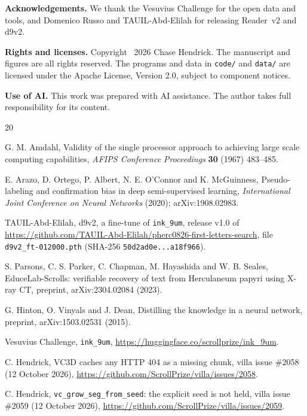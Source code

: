 \documentclass[11pt]{article}
\begin{document}
\medskip
\noindent\textbf{Acknowledgements.} We thank the Vesuvius Challenge for the open data and tools, and Domenico Russo and TAUIL-Abd-Elilah for releasing Reader~v2 and d9v2.

\noindent\textbf{Rights and licenses.} Copyright \textcopyright\ 2026 Chase Hendrick. The manuscript and figures are all rights reserved. The programs and data in \texttt{code/} and \texttt{data/} are licensed under the Apache License, Version 2.0, subject to component notices.

\noindent\textbf{Use of AI.} This work was prepared with AI assistance. The author takes full responsibility for its content.

\begin{thebibliography}{20}

 G. M. Amdahl, Validity of the single processor approach to achieving large scale computing capabilities, \emph{AFIPS Conference Proceedings} \textbf{30} (1967) 483--485.

 E. Arazo, D. Ortego, P. Albert, N. E. O'Connor and K. McGuinness, Pseudo-labeling and confirmation bias in deep semi-supervised learning, \emph{International Joint Conference on Neural Networks} (2020); arXiv:1908.02983.

 TAUIL-Abd-Elilah, d9v2, a fine-tune of \texttt{ink\_9um}, release v1.0 of \url{https://github.com/TAUIL-Abd-Elilah/pherc0826-first-letters-search}, file \texttt{d9v2\_ft-012000.pth} (SHA-256 \texttt{50d2ad0e...a18f966}).

 S. Parsons, C. S. Parker, C. Chapman, M. Hayashida and W. B. Seales, EduceLab-Scrolls: verifiable recovery of text from Herculaneum papyri using X-ray CT, preprint, arXiv:2304.02084 (2023).

 G. Hinton, O. Vinyals and J. Dean, Distilling the knowledge in a neural network, preprint, arXiv:1503.02531 (2015).

 Vesuvius Challenge, \texttt{ink\_9um}, \url{https://huggingface.co/scrollprize/ink_9um}.

 C. Hendrick, VC3D caches any HTTP 404 as a missing chunk, villa issue \#2058 (12 October 2026), \url{https://github.com/ScrollPrize/villa/issues/2058}.

 C. Hendrick, \texttt{vc\_grow\_seg\_from\_seed}: the explicit seed is not held, villa issue \#2059 (12 October 2026), \url{https://github.com/ScrollPrize/villa/issues/2059}.


\end{thebibliography}
\end{document}
